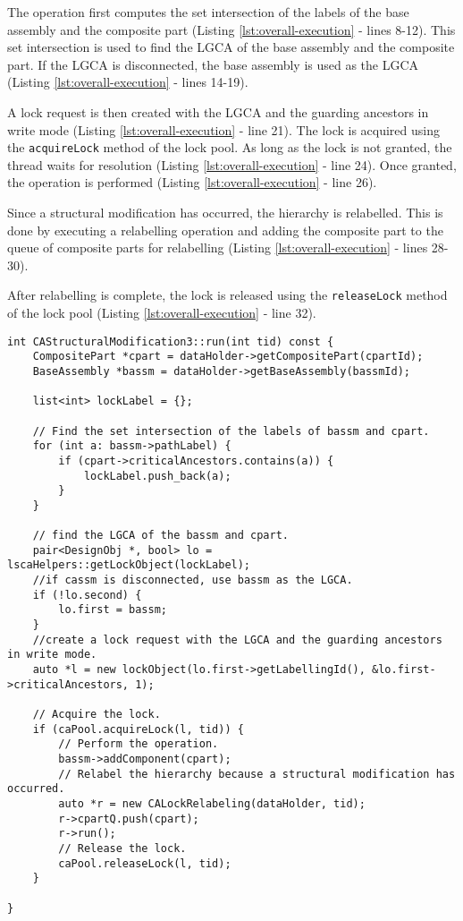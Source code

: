 The operation first computes the set intersection of the labels of the base assembly and the composite part (Listing \ref{lst:overall-execution} - lines 8-12). This set intersection is used to find the LGCA of the base assembly and the composite part. If the LGCA is disconnected, the base assembly is used as the LGCA (Listing \ref{lst:overall-execution} - lines 14-19).

A lock request is then created with the LGCA and the guarding ancestors in write mode (Listing \ref{lst:overall-execution} - line 21). The lock is acquired using the \texttt{acquireLock} method of the lock pool. As long as the lock is not granted, the thread waits for resolution (Listing \ref{lst:overall-execution} - line 24). Once granted, the operation is performed (Listing \ref{lst:overall-execution} - line 26).

Since a structural modification has occurred, the hierarchy is relabelled. This is done by executing a relabelling operation and adding the composite part to the queue of composite parts for relabelling (Listing \ref{lst:overall-execution} - lines 28-30). 

After relabelling is complete, the lock is released using the \texttt{releaseLock} method of the lock pool (Listing \ref{lst:overall-execution} - line 32).


\begin{lstlisting}[caption={Overall execution of an operation in CALock}, label={lst:overall-execution}]
int CAStructuralModification3::run(int tid) const {
    CompositePart *cpart = dataHolder->getCompositePart(cpartId);
    BaseAssembly *bassm = dataHolder->getBaseAssembly(bassmId);

    list<int> lockLabel = {};

    // Find the set intersection of the labels of bassm and cpart.
    for (int a: bassm->pathLabel) {
        if (cpart->criticalAncestors.contains(a)) {
            lockLabel.push_back(a);
        }
    }

    // find the LGCA of the bassm and cpart.
    pair<DesignObj *, bool> lo = lscaHelpers::getLockObject(lockLabel);
    //if cassm is disconnected, use bassm as the LGCA.
    if (!lo.second) {
        lo.first = bassm;
    }
    //create a lock request with the LGCA and the guarding ancestors in write mode. 
    auto *l = new lockObject(lo.first->getLabellingId(), &lo.first->criticalAncestors, 1);

    // Acquire the lock.
    if (caPool.acquireLock(l, tid)) {
        // Perform the operation.
        bassm->addComponent(cpart);
        // Relabel the hierarchy because a structural modification has occurred.
        auto *r = new CALockRelabeling(dataHolder, tid);
        r->cpartQ.push(cpart);
        r->run();
        // Release the lock.
        caPool.releaseLock(l, tid);
    }

}

\end{lstlisting}